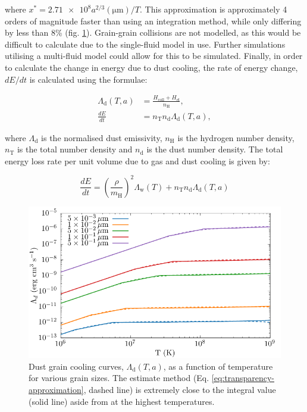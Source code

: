 \documentclass[fleqn,usenatbib]{mnras}
\begin{document}
\noindent
where $x^* = \num{2.71e8} a^{2/3} (\si{\micro\metre})/T$.
This approximation is approximately 4 orders of magnitude faster than using an integration method, while only differing by less than 8\% (fig. \ref{fig:lambdacomparison}).
Grain-grain collisions are not modelled, as this would be difficult to calculate due to the single-fluid model in use.
Further simulations utilising a multi-fluid model could allow for this to be simulated.
Finally, in order to calculate the change in energy due to dust cooling, the rate of energy change, $dE/dt$ is calculated using the formulae:

\begin{subequations}
  \label{eq:transparency-approximation}
  \begin{align}
    \Lambda_\text{d}(T,a) & = \frac{H_\text{coll} + H_\text{el}}{n_\text{H}} , \\
    \frac{dE}{dt}         & = n_\text{T} n_\text{d} \Lambda_\text{d} (T,a) ,
  \end{align}
\end{subequations}

\noindent
where $\Lambda_\text{d}$ is the normalised dust emissivity,
$n_\text{H}$ is the hydrogen number density,
$n_\text{T}$ is the total number density
and $n_\text{d}$ is the dust number density.
The total energy loss rate per unit volume due to gas and dust cooling is given by:

\begin{equation}
	\frac{dE}{dt} = \left( \frac{\rho}{m_\text{H}} \right)^2 \Lambda_\text{w}(T) + n_\text{T} n_\text{d} \Lambda_\text{d} (T,a)
\end{equation}

\begin{figure}
  \centering
  \includegraphics[width=\linewidth]{assets/grain-transparency/lambda-comp.pdf}
  \caption[Comparison of electron transparency methods.]{Dust grain cooling curves, $\Lambda_\text{d}(T,a)$, as a function of temperature for various grain sizes. The estimate method (Eq. \ref{eq:transparency-approximation}, dashed line) is extremely close to the integral value (solid line) aside from at the highest temperatures.}
  \label{fig:lambdacomparison}
\end{figure}
\end{document}
